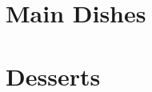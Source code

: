 \documentclass{report}
\begin{document}
\frontmatter

\newpage
\chead{}
\tableofcontents

\mainmatter
\chapter{Main Dishes}

\chapter{Desserts}

\end{document}
